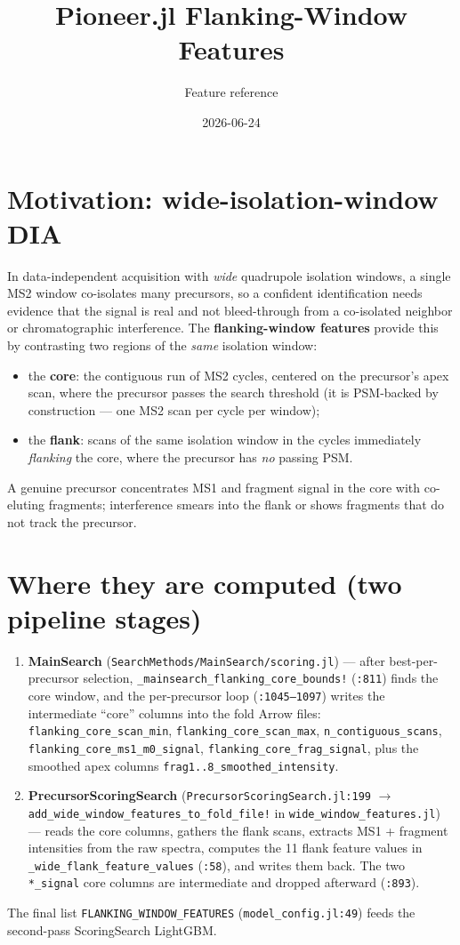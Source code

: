 \documentclass[11pt]{article}
\title{Pioneer.jl Flanking-Window Features}
\author{Feature reference}
\date{2026-06-24}
\newcommand{\code}[1]{\texttt{#1}}
\begin{document}
\maketitle

\section{Motivation: wide-isolation-window DIA}
In data-independent acquisition with \emph{wide} quadrupole isolation windows, a single
MS2 window co-isolates many precursors, so a confident identification needs evidence that the
signal is real and not bleed-through from a co-isolated neighbor or chromatographic
interference. The \textbf{flanking-window features} provide this by contrasting two regions of
the \emph{same} isolation window:
\begin{itemize}
  \item the \textbf{core}: the contiguous run of MS2 cycles, centered on the precursor's apex
        scan, where the precursor passes the search threshold (it is PSM-backed by
        construction --- one MS2 scan per cycle per window);
  \item the \textbf{flank}: scans of the same isolation window in the cycles immediately
        \emph{flanking} the core, where the precursor has \emph{no} passing PSM.
\end{itemize}
A genuine precursor concentrates MS1 and fragment signal in the core with co-eluting
fragments; interference smears into the flank or shows fragments that do not track the
precursor.

\section{Where they are computed (two pipeline stages)}
\begin{enumerate}
  \item \textbf{MainSearch} (\code{SearchMethods/MainSearch/scoring.jl}) --- after
        best-per-precursor selection, \code{\_mainsearch\_flanking\_core\_bounds!}
        (\code{:811}) finds the core window, and the per-precursor loop (\code{:1045--1097})
        writes the intermediate ``core'' columns into the fold Arrow files:
        \code{flanking\_core\_scan\_min}, \code{flanking\_core\_scan\_max},
        \code{n\_contiguous\_scans}, \code{flanking\_core\_ms1\_m0\_signal},
        \code{flanking\_core\_frag\_signal}, plus the smoothed apex columns
        \code{frag1..8\_smoothed\_intensity}.
  \item \textbf{PrecursorScoringSearch} (\code{PrecursorScoringSearch.jl:199} $\to$
        \code{add\_wide\_window\_features\_to\_fold\_file!} in \code{wide\_window\_features.jl})
        --- reads the core columns, gathers the flank scans, extracts MS1 + fragment
        intensities from the raw spectra, computes the 11 flank feature values in
        \code{\_wide\_flank\_feature\_values} (\code{:58}), and writes them back. The two
        \code{*\_signal} core columns are intermediate and dropped afterward (\code{:893}).
\end{enumerate}
The final list \code{FLANKING\_WINDOW\_FEATURES} (\code{model\_config.jl:49}) feeds the
second-pass ScoringSearch LightGBM.
\end{document}
